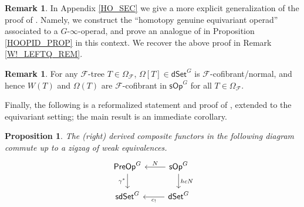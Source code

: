 \documentclass[a4paper,10pt
,draft
]{article}%
\numberwithin{equation}{section}
\numberwithin{figure}{section}
\newtheorem{proposition}[equation]{Proposition}%
\theoremstyle{definition} %
\newtheorem{remark}[equation]{Remark}%
\newcommand{\sOp}{\ensuremath{\mathsf{sOp}}}%
\newcommand{\dSet}{\mathsf{dSet}}
\newcommand{\1}{\ensuremath{\mathbbm 1}}%
\begin{document}
\begin{remark}
      In Appendix \ref{HO_SEC} we give a more explicit generalization of the proof of \cite[Prop. 4.9]{CM13b}.
      Namely, we construct the ``homotopy genuine equivariant operad'' associated to a $G$-$\infty$-operad,
      and prove an analogue of \cite[Prop. 4.8]{CM13b} in Proposition \ref{HOOPID_PROP} in this context.
      We recover the above proof in Remark \ref{W!_LEFTQ_REM}.
\end{remark}

\begin{remark}
      For any $\mathcal F$-tree $T \in \Omega_{\mathcal F}$, $\Omega[T] \in \dSet^G$ is $\mathcal F$-cofibrant/normal,
      and hence $W(T)$ and $\Omega(T)$ are $\mathcal F$-cofibrant in $\sOp^G$ for all $T \in \Omega_{\mathcal F}$.
\end{remark}






Finally, the following is a reformalized statement and proof of \cite[Thm. 8.14]{CM13b}, extended to the equivariant setting;
the main result is an immediate corollary.

\begin{proposition}\label{COMUOTOHOM PROP}
      The (right) derived composite functors in the following diagram commute up to a zigzag of weak equivalences. 
      \[
            \begin{tikzcd}
                  \mathsf{PreOp}^G \ar{d}[swap]{\gamma^{\**}}&
                  \mathsf{sOp}^G \ar{l}[swap]{N} \ar{d}{hcN}
                  \\
                  \mathsf{sdSet}^G &
                  \mathsf{dSet}^G \ar{l}{c_{!}}
            \end{tikzcd}
      \]
\end{proposition}
\end{document}
